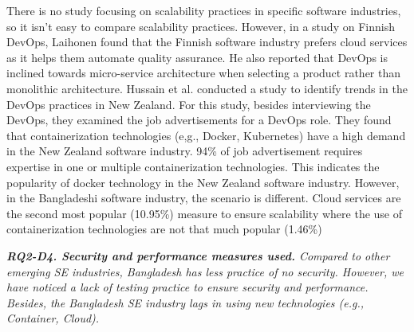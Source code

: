 There is no study focusing on scalability practices in specific software industries, so it isn't easy to compare scalability practices. However, in a study on Finnish DevOps, Laihonen\citep{Laihonen2018} found that the Finnish software industry prefers cloud services as it helps them automate quality assurance. He also reported that DevOps is inclined towards micro-service architecture when selecting a product rather than monolithic architecture. Hussain et al.\citep{Hussain2017} conducted a study to identify trends in the DevOps practices in New Zealand. For this study, besides interviewing the DevOps, they examined the job advertisements for a DevOps role. They found that containerization technologies (e,g., Docker, Kubernetes) have a high demand in the New Zealand software industry. 94\% of job advertisement requires expertise in one or multiple containerization technologies. This indicates the popularity of docker technology in the New Zealand software industry. However, in the Bangladeshi software industry, the scenario is different. Cloud services are the second most popular (10.95\%) measure to ensure scalability where the use of containerization technologies are not that much popular (1.46\%)

\begin{tcolorbox}[flushleft upper,boxrule=1pt,arc=0pt,left=0pt,right=0pt,top=0pt,bottom=0pt,colback=white,after=\ignorespacesafterend\par\noindent]
\nd\it{\bf{RQ2-D4. Security and performance measures used.}}
Compared to other emerging SE industries, Bangladesh has less practice of no security. However, we have noticed a lack of testing practice to ensure security and performance. Besides, the Bangladesh SE industry lags in using new technologies (e.g., Container, Cloud).
\end{tcolorbox}